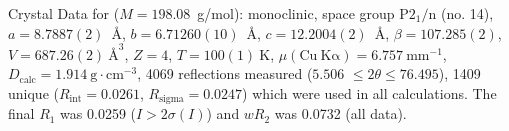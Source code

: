 \documentclass{minimal}
\begin{document}
Crystal Data for  (\(M = 198.08\)~g/mol): monoclinic, space group \(\mathrm{P2_{1}/n}\) (no. 14), \( a = 8.7887(2)\)~\AA{}, \( b = 6.71260(10)\)~\AA{}, \( c = 12.2004(2)\)~\AA{}, \( \beta = 107.285(2)\)\degree{}, \( V = 687.26(2)~\text{\AA{}}^3 \), \( Z = 4 \), \( T = 100(1)~\text{K} \), \( \mu(\mathrm{Cu~K\alpha}) = 6.757~\text{mm}^{-1} \), \( D_{\text{calc}} = 1.914~\text{g} \cdot \text{cm} ^{-3} \), 4069 reflections measured (\(5.506\)\degree{} \(\leq 2\theta \leq 76.495\)\degree{}), 1409 unique (\( R_{\mathrm{int}} = 0.0261 \), \(R_{\mathrm{sigma}} = 0.0247 \)) which were used in all calculations. The final \(R_1\) was 0.0259 (\(I > 2\sigma(I)\)) and \(wR_2\) was 0.0732 (all data).
\end{document}
